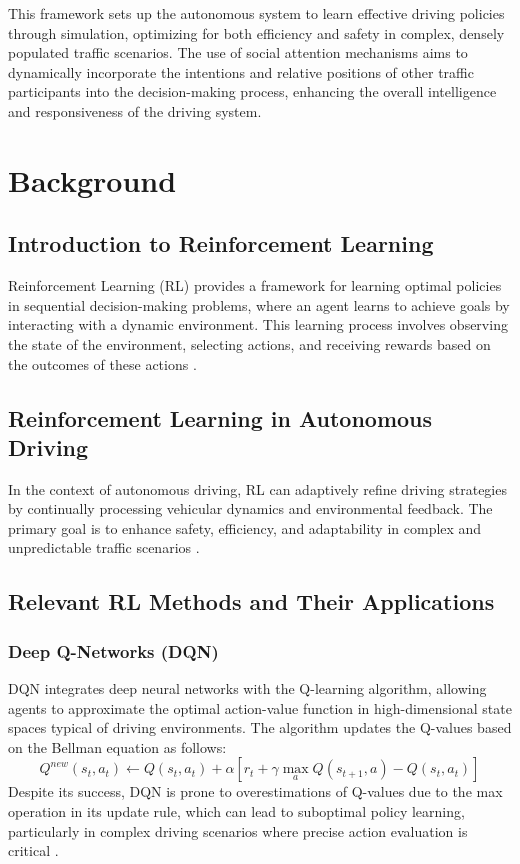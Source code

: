 \documentclass{article}
\begin{document}
This framework sets up the autonomous system to learn effective driving policies through simulation, optimizing for both efficiency and safety in complex, densely populated traffic scenarios. The use of social attention mechanisms aims to dynamically incorporate the intentions and relative positions of other traffic participants into the decision-making process, enhancing the overall intelligence and responsiveness of the driving system.

\section{Background}

\subsection{Introduction to Reinforcement Learning}
Reinforcement Learning (RL) provides a framework for learning optimal policies in sequential decision-making problems, where an agent learns to achieve goals by interacting with a dynamic environment. This learning process involves observing the state of the environment, selecting actions, and receiving rewards based on the outcomes of these actions \cite{7339478}.

\subsection{Reinforcement Learning in Autonomous Driving}
In the context of autonomous driving, RL can adaptively refine driving strategies by continually processing vehicular dynamics and environmental feedback. The primary goal is to enhance safety, efficiency, and adaptability in complex and unpredictable traffic scenarios \cite{7339478}.

\subsection{Relevant RL Methods and Their Applications}

\subsubsection{Deep Q-Networks (DQN)}
DQN integrates deep neural networks with the Q-learning algorithm, allowing agents to approximate the optimal action-value function in high-dimensional state spaces typical of driving environments. The algorithm updates the Q-values based on the Bellman equation as follows:
\[
Q^{new}(s_t, a_t) \leftarrow Q(s_t, a_t) + \alpha \left[r_t + \gamma \max_{a}Q(s_{t+1}, a) - Q(s_t, a_t)\right]
\]
Despite its success, DQN is prone to overestimations of Q-values due to the max operation in its update rule, which can lead to suboptimal policy learning, particularly in complex driving scenarios where precise action evaluation is critical \cite{DBLP:journals/corr/HasseltGS15}.
\end{document}
